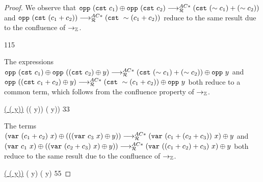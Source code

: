 \begin{proof}
We observe that $\opp{\cst{c_1}} \oplus \opp{\cst{c_2}} \MRAC \cst{(\sim c_1) + (\sim c_2)}$
and $\opp{\cst{(c_1 + c_2)}} \MRAC \cst{\sim (c_1 + c_2)}$ reduce to the same result due to the confluence of $\ra_\bb{Z}$.


\cp
{
}
{
   \oplus {}
}
{
}
{11}{5}

The expressions $\opp{\cst{c_1}} \oplus \opp{(\cst{c_2} \oplus y)} \MRAC \cst{(\sim c_1) + (\sim c_2)} \oplus \opp{y}$
and $ \opp{(\cst{c_1 + c_2} \oplus y)} \MRAC \add{ \cst{\sim (c_1 + c_2)} }{\opp{y}}$
both reduce to a common term, which follows from the confluence property of $\ra_\bb{Z}$.


\cp
{
   \oplus \underline{( \oplus ( \oplus y))}
}
{
   \oplus (( \oplus y))
}
{
   \oplus ( \oplus y))
}{3}{3}

The terms $\var{(c_1 + c_2)}{x} \oplus ((\var{c_3}{x} \oplus y)) \MRAC \add{\var{(c_1 + (c_2 + c_3))}{x}}{y}$
and $\var{c_1}{x} \oplus (\var{(c_2 + c_3)}{x} \oplus y)) \MRAC \add{\var{((c_1 + c_2) + c_3)}{x}}{y}$
both reduce to the same result due to the confluence of $\ra_\bb{Z}$.


\cp
{ \oplus \underline{( \oplus ( \oplus y))}}
{ \oplus ( \oplus y) }
{ \oplus ( \oplus y) }
{5}{5}


\end{proof}
